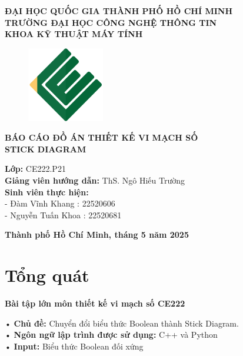 \documentclass[a4paper,12pt]{article}
\begin{document}
\thispagestyle{empty}
\begin{center}
\textbf{\Large ĐẠI HỌC QUỐC GIA THÀNH PHỐ HỒ CHÍ MINH}\\
\textbf{\Large TRƯỜNG ĐẠI HỌC CÔNG NGHỆ THÔNG TIN}\\
\textbf{\Large KHOA KỸ THUẬT MÁY TÍNH}\\[1cm]

\begin{figure}[H]
    \centering
    \includegraphics[width=0.3\textwidth]{../PNG/CE.png}
    \label{fig:LOGO_CE}\\
\end{figure}

\vspace {1cm}

\textbf{\Large BÁO CÁO ĐỒ ÁN THIẾT KẾ VI MẠCH SỐ}\\[0.5cm]
\textbf{\Large STICK DIAGRAM}\\[5cm]

\begin{flushleft}

\textbf{Lớp:} CE222.P21\\
\textbf{Giảng viên hướng dẫn:} ThS. Ngô Hiếu Trường\\
\textbf{Sinh viên thực hiện:} \\
- Đàm Vĩnh Khang : 22520606 \\
- Nguyễn Tuấn Khoa : 22520681\\[3.5cm]

\end{flushleft}
\end{center}
\begin{center}
\textbf{Thành phố Hồ Chí Minh, tháng 5 năm 2025}
\end{center}
\newpage
\setcounter{page}{1}
\tableofcontents
\newpage


\section{Tổng quát}
\begin{center}
\textbf{\large Bài tập lớn môn thiết kế vi mạch số CE222}
\end{center}
• \textbf{Chủ đề:} Chuyển đổi biểu thức Boolean thành Stick Diagram.\\
• \textbf{Ngôn ngữ lập trình được sử dụng:} C++ và Python\\
• \textbf{Input:} Biểu thức Boolean đối xứng
\end{document}
